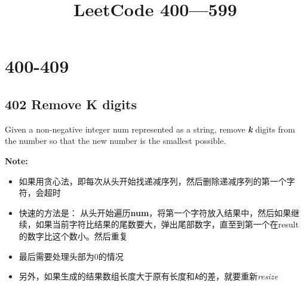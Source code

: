 \documentclass[a4paper,12pt]{article}
\title{LeetCode 400---599}
\begin{document}
	\maketitle
\section{400-409}
\subsection{402 Remove K digits}
Given a non-negative integer num represented as a string, remove \textit{\textbf{k}} digits from the number so that the new number is the smallest possible.
\par
\vspace{0.5em}
\noindent
\textbf{\large{Note:}}
\begin{CJK*}{UTF8}{gbsn}
\begin{itemize}
\item 如果用贪心法，即每次从头开始找递减序列，然后删除递减序列的第一个字符，会超时
\item 快速的方法是： 从头开始遍历\textbf{num}，将第一个字符放入结果中，然后如果继续，如果当前字符比结果的尾数要大，弹出尾部数字，直至到第一个在result的数字比这个数小。然后重复
\item 最后需要处理头部为0的情况
\item 另外，如果生成的结果数组长度大于原有长度和\textit{\textbf{k}}的差，就要重新\textit{resize}
\end{itemize}
\clearpage
\end{CJK*}
\end{document}
